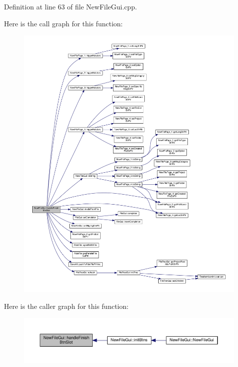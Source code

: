 Definition at line 63 of file New\-File\-Gui.\-cpp.



Here is the call graph for this function\-:
\nopagebreak
\begin{figure}[H]
\begin{center}
\leavevmode
\includegraphics[width=350pt]{class_new_file_gui_a50cf414bdb9ea40f3cd4ca4fa4566b77_cgraph}
\end{center}
\end{figure}




Here is the caller graph for this function\-:
\nopagebreak
\begin{figure}[H]
\begin{center}
\leavevmode
\includegraphics[width=350pt]{class_new_file_gui_a50cf414bdb9ea40f3cd4ca4fa4566b77_icgraph}
\end{center}
\end{figure}


